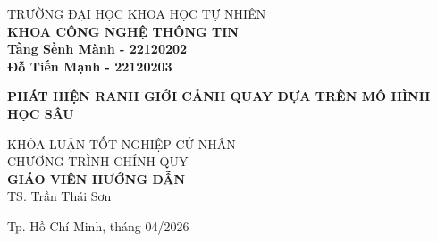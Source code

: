\thispagestyle{empty}
\begin{titlepage}

\begin{center}
TRƯỜNG ĐẠI HỌC KHOA HỌC TỰ NHIÊN\\
\textbf{KHOA CÔNG NGHỆ THÔNG TIN}\\[2cm]

{\large \bfseries Tằng Sềnh Mành - 22120202\\}
{\large \bfseries Đỗ Tiến Mạnh - 22120203\\[2cm]}

{ \Large \bfseries PHÁT HIỆN RANH GIỚI CẢNH QUAY DỰA TRÊN MÔ HÌNH HỌC SÂU\\[2cm] }

\large KHÓA LUẬN TỐT NGHIỆP CỬ NHÂN\\
\large CHƯƠNG TRÌNH CHÍNH QUY\\[2cm]

\textbf{GIÁO VIÊN HƯỚNG DẪN}\\
TS. Trần Thái Sơn\\


\vfill
Tp. Hồ Chí Minh, tháng 04/2026

\end{center}

\end{titlepage}
